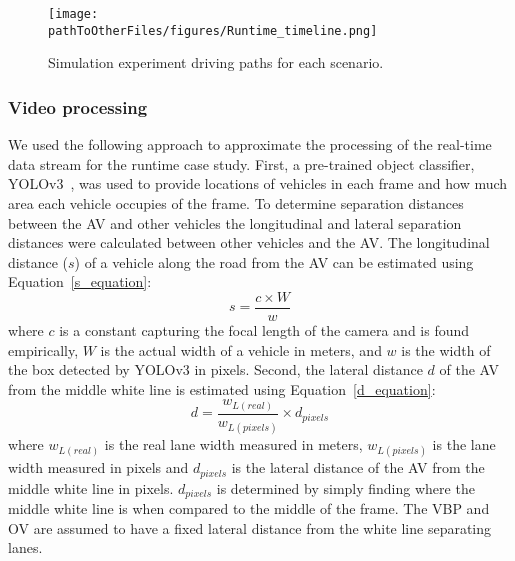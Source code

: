 \begin{figure}
    \centering
    \texttt{[image: \\pathToOtherFiles/figures/Runtime\_timeline.png]}
    \caption{Simulation experiment driving paths for each scenario.}
    \label{fig:Runtime_timeline}
\end{figure} 

\subsubsection{Video processing}
%
We used the following approach to approximate the processing of the real-time data stream for the runtime case study. 
%
First, a pre-trained object classifier, YOLOv3~\cite{Yolo}, was used to provide locations of vehicles in each frame and how much area each vehicle occupies of the frame. 
%
To determine separation distances between the AV and other vehicles %
the longitudinal and lateral separation distances were calculated between other vehicles and the AV.
%
The longitudinal distance ($s$) of a vehicle along the road from the AV can be estimated using Equation~\ref{s_equation}:
\begin{equation}\label{s_equation}
    s = \frac{c\times W}{w}
\end{equation}
where $c$ is a constant capturing the focal length of the camera and is found empirically, $W$ is the actual width of a vehicle in meters, and $w$ is the width of the box detected by YOLOv3 in pixels. 
%
Second, the lateral distance $d$ of the AV from the middle white line is estimated using Equation~\ref{d_equation}: 
%
\begin{equation}\label{d_equation}
    d = \frac{w_{L (real)}}{w_{L (pixels)}} \times d_{pixels}
\end{equation}
%
where $w_{L (real)}$ is the real lane width measured in meters, $w_{L (pixels)}$ is the lane width measured in pixels and $d_{pixels}$ is the lateral distance of the AV from the middle white line in pixels. $d_{pixels}$ is determined by simply finding where the middle white line is when compared to the middle of the frame. The VBP and OV are assumed to have a fixed lateral distance from the white line separating lanes. 
